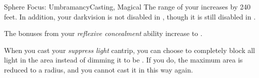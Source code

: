 \begin{feat}{Sphere Focus: Umbramancy}{Casting, Magical}
         The range of your  increases by 240 feet.
        In addition, your darkvision is not disabled in , though it is still disabled in .

          The bonuses from your \textit{reflexive concealment} ability increase to .

         When you cast your \textit{suppress light} cantrip, you can choose to completely block all light in the area instead of dimming it to be .
        If you do, the maximum area is reduced to a \medarea radius, and you  cannot cast it in this way again.
    \end{feat}

